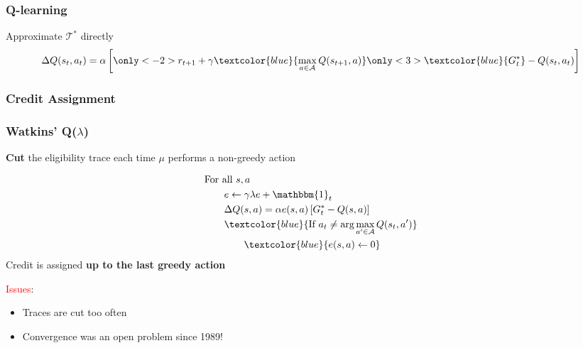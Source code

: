 \documentclass{beamer}
\begin{document}
\begin{frame}
\frametitle{Q-learning}
Approximate $\mathcal{T}^*$ directly
\[
	\Delta Q(s_t,a_t) = \alpha
	\left[ 
	\only<-2>{
	r_{t+1} +\gamma\textcolor{blue}{\max_{a\in\mathcal{A}}Q(s_{t+1},a)}
	}\only<3>{\textcolor{blue}{G_t^*}}
	 - Q(s_t,a_t)\right]
\]
\end{frame}

\begin{frame}
\frametitle{Credit Assignment}

\end{frame}

\begin{frame}
\frametitle{Watkins' Q($\lambda$)}
\textbf{Cut} the eligibility trace each time $\mu$ performs a non-greedy action

\begin{align*}
	&\text{For all $s,a$}\\
	&\qquad e \gets \gamma\lambda e + \mathbbm{1}_t \\
	&\qquad \Delta Q(s,a) = \alpha e(s,a)
	\left[G_t^* - Q(s,a)\right]\\
	&\qquad\textcolor{blue}{\text{If } a_t \neq 	\arg\max_{a'\in\mathcal{A}}Q(s_t,a')} \\
	&\qquad\qquad \textcolor{blue}{e(s,a) \gets 0} 
\end{align*}
\vfill
Credit is assigned \textbf{up to the last greedy action}

\textcolor{red}{Issues}: 
\begin{itemize}
\item Traces are cut too often
\item Convergence was an open problem since 1989!
\end{itemize}
\end{frame}
\end{document}
